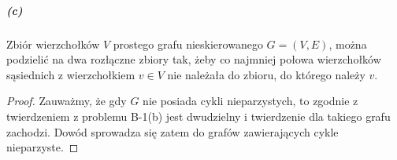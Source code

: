 \subparagraph{(c)}
\begin{twierdzenie*}
	Zbiór wierzchołków $V$ prostego grafu nieskierowanego $G=(V,E)$, można podzielić na dwa rozłączne zbiory tak, żeby co najmniej połowa wierzchołków sąsiednich z wierzchołkiem $v\in V$ nie należała do zbioru, do którego należy $v$.
\end{twierdzenie*}
\begin{proof}
Zauważmy, że gdy $G$ nie posiada cykli nieparzystych, to zgodnie z twierdzeniem z problemu B-1(b) jest dwudzielny i twierdzenie dla takiego grafu zachodzi. Dowód sprowadza się zatem do grafów zawierających cykle nieparzyste.


\end{proof}

